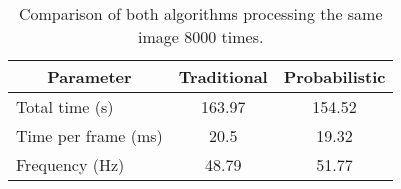 \begin{table}
\begin{center}
\begin{tabular}{| l | c | c |}
\hline
\multicolumn{1}{|c|}{Parameter}	 & 	\multicolumn{1}{c|}{Traditional}	 & 	\multicolumn{1}{c|}{Probabilistic}\\ \hline
Total time (s)	& 	163.97	 &	154.52\\ \hline
Time per frame (ms)	& 	20.5	 & 	19.32\\ \hline
Frequency (Hz)		& 	48.79	 & 	51.77\\ \hline
\end{tabular}
\caption{Comparison of both algorithms processing the same image 8000 times.}
\label{tab_compeiffel}
\end{center}
\end{table}
